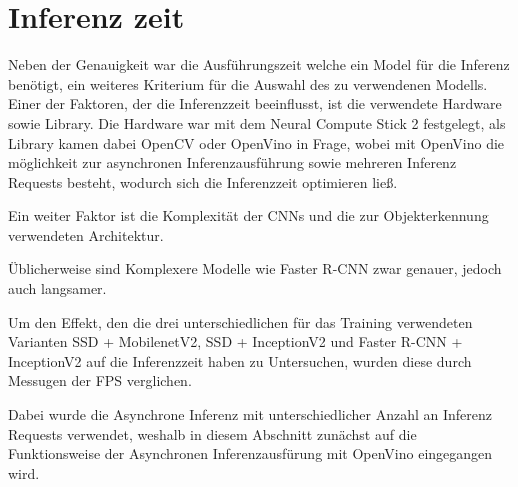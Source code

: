 




\section{Inferenz zeit}\label{sec:infertime}

Neben der Genauigkeit war die Ausführungszeit welche ein Model für die 
Inferenz benötigt, ein weiteres Kriterium für die Auswahl des zu 
verwendenen Modells.
Einer der Faktoren, der die Inferenzzeit beeinflusst, ist die 
verwendete Hardware sowie Library.
Die Hardware war mit dem Neural Compute Stick 2 festgelegt, als 
Library kamen dabei OpenCV oder OpenVino in Frage, wobei
mit OpenVino die möglichkeit 
zur asynchronen Inferenzausführung sowie mehreren Inferenz Requests besteht,
wodurch sich die Inferenzzeit optimieren ließ.

Ein weiter Faktor ist die Komplexität der CNNs und die zur 
Objekterkennung verwendeten Architektur.

Üblicherweise sind Komplexere Modelle wie Faster R-CNN zwar genauer, 
jedoch auch langsamer.

Um den Effekt, den die drei unterschiedlichen 
für das Training verwendeten Varianten SSD + MobilenetV2, 
SSD + InceptionV2 und Faster R-CNN + InceptionV2 auf die Inferenzzeit
haben zu Untersuchen, wurden diese durch Messugen der FPS 
verglichen.

Dabei wurde die Asynchrone Inferenz mit unterschiedlicher Anzahl 
an Inferenz Requests verwendet, weshalb in diesem Abschnitt 
zunächst auf die Funktionsweise der Asynchronen Inferenzausfürung 
mit OpenVino eingegangen wird.


